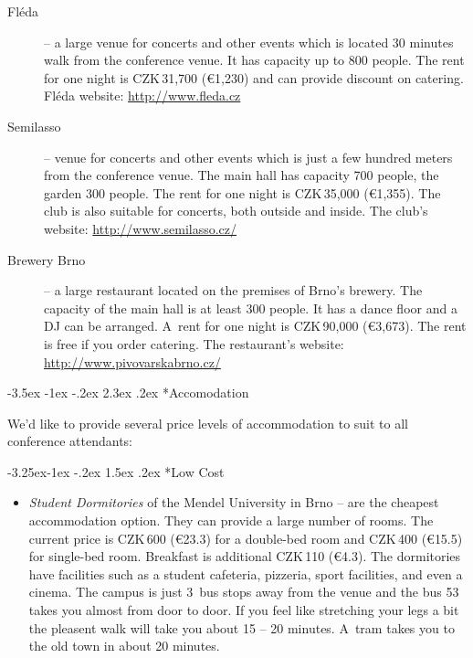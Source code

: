 \documentclass[10pt,a4paper]{article}
\makeatletter
\renewcommand\section{%
\@startsection{section}{1}{\z@}%
              {-3.5ex \@plus -1ex \@minus -.2ex}%
              {2.3ex \@plus.2ex}%
              {\color{kdelight}\sffamily\LARGE\bfseries}}
\renewcommand\subsection{%
\@startsection{subsection}{2}{\z@}%
              {-3.25ex\@plus -1ex \@minus -.2ex}%
              {1.5ex \@plus .2ex}%
              {\color{kdelight}\sffamily\Large\bfseries}}
\makeatother
\begin{document}
\begin{description}
\item[\color{kdedarker} Fléda] -- a large venue for concerts and other events which is located
30 minutes walk from the conference venue. It has capacity up to 800 people.
The rent for one night is CZK\,31,700 (\euro{1,230}) and can provide discount
on catering. Fléda website: \url{http://www.fleda.cz}
\item[\color{kdedarker} Semilasso] -- venue for concerts and other events which is
just a few hundred meters from the conference venue. The main hall
has capacity 700 people, the garden 300 people. The rent for one night
is CZK\,35,000 (\euro{1,355}). The club is also suitable for concerts,
both outside and inside. The club's website:
\url{http://www.semilasso.cz/}
\item[\color{kdedarker} Brewery Brno] -- a large restaurant located on the premises of
Brno's brewery. The capacity of the main hall is at least 300 people.
It has a dance floor and a DJ can be arranged. A~rent for one night is
CZK\,90,000 (\euro{3,673}). The rent is free if you order catering. The
restaurant's website:
\url{http://www.pivovarskabrno.cz/}
\end{description}

\cleardoublepage

\section*{Accomodation}
We'd like to provide several price levels of accommodation to suit to all conference attendants:

\subsection*{Low Cost}
\begin{itemize}
\item \emph{Student Dormitories} of the Mendel University in Brno -- 
are the cheapest accommodation option. They can provide a
large number of rooms. The current price is CZK\,600 (\euro{23.3}) for a
double-bed room and CZK\,400 (\euro{15.5}) for single-bed room. Breakfast is additional
CZK\,110 (\euro{4.3}). The dormitories have facilities
such as a student cafeteria, pizzeria, sport facilities, and even a
cinema. The campus is just 3~bus stops away from the venue and the bus
53 takes you almost from door to door. If you feel like stretching your
legs a bit the pleasent walk will take you about 15 -- 20 minutes. A~tram
takes you to the old town in about 20 minutes.
\end{itemize}
\end{document}
